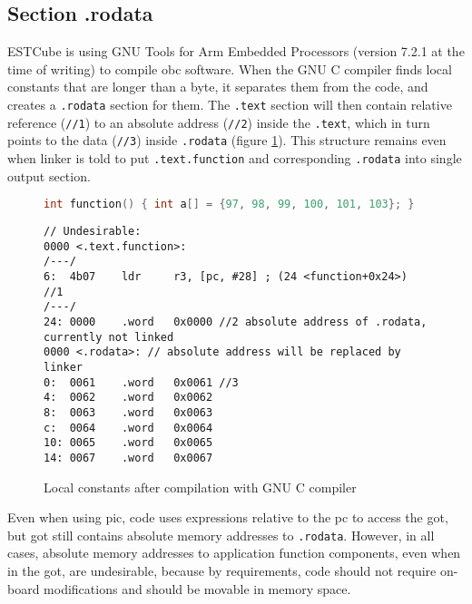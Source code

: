 
\subsection{Section .rodata}\label{s:rodata}

ESTCube is using GNU Tools for Arm Embedded Processors (version 7.2.1 at the time of writing) to compile \gls{obc} software. When the GNU C compiler finds local constants that are longer than a byte, it separates them from the code, and creates a \texttt{.rodata} section for them. The \texttt{.text} section will then contain relative reference (\texttt{//1}) to an absolute address (\texttt{//2}) inside the \texttt{.text}, which in turn points to the data (\texttt{//3}) inside \texttt{.rodata} (figure \ref{fig:rodata}). This structure remains even when linker is told to put \texttt{.text.function} and corresponding \texttt{.rodata} into single output section.

\begin{figure} [htb]
\begin{lstlisting}[language=C]
int function() { int a[] = {97, 98, 99, 100, 101, 103}; }
\end{lstlisting}
\begin{lstlisting}[style=asm]
// Undesirable:
0000 <.text.function>:
/---/
6:  4b07    ldr     r3, [pc, #28] ; (24 <function+0x24>) //1
/---/
24: 0000    .word   0x0000 //2 absolute address of .rodata, currently not linked
0000 <.rodata>: // absolute address will be replaced by linker
0:  0061    .word   0x0061 //3
4:  0062    .word   0x0062
8:  0063    .word   0x0063
c:  0064    .word   0x0064
10: 0065    .word   0x0065
14: 0067    .word   0x0067
\end{lstlisting}
\caption{Local constants after compilation with GNU C compiler}
\label{fig:rodata}
\end{figure}

Even when using \gls{pic}, code uses expressions relative to the \gls{pc} to access the \gls{got}, but \gls{got} still contains absolute memory addresses to \texttt{.rodata}. However, in all cases, absolute memory addresses to application function components, even when in the \gls{got}, are undesirable, because by requirements, code should not require on-board modifications and should be movable in memory space.

